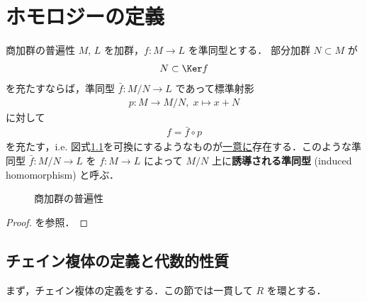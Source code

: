 \documentclass[algtopo_main]{subfiles}
\begin{document}
\setcounter{chapter}{1}

\chapter{ホモロジーの定義}

\begin{mylem}[label=lem:quomod-univ]{商加群の普遍性}
    $M,\, L$ を加群，$f \colon M \to L$ を準同型とする．
    部分加群 $N \subset M$ が
    \begin{align}
        N \subset \Ker f
    \end{align}
    を充たすならば，準同型 $\bar{f} \colon M/N \to L$ であって標準射影
    \begin{align}
        p \colon M \to M/N,\; x \mapsto x + N
    \end{align}
    に対して
    \begin{align}
        f = \bar{f} \circ p
    \end{align}
    を充たす，i.e. 図式\ref{fig:quomod-univ}を可換にするようなものが\underline{一意に}存在する．このような準同型 $\bar{f} \colon M/N \to L$ を $f \colon M \to L$ によって $M/N$ 上に\textbf{誘導される準同型} (induced homomorphism) と呼ぶ．
\end{mylem}
\begin{figure}[H]
    \centering
    \caption{商加群の普遍性}
    \label{fig:quomod-univ}
\end{figure}%

\begin{proof}
    を参照．
\end{proof}


\section{チェイン複体の定義と代数的性質}

まず，チェイン複体の定義をする．この節では一貫して $R$ を環とする．
\end{document}
